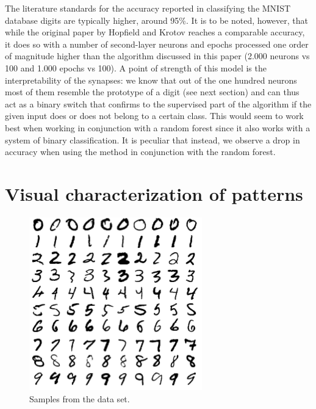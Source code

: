 \documentclass[a4paper]{report}
\begin{document}
The literature standards for the accuracy reported in classifying the MNIST database digits are typically higher, around 95\%.
It is to be noted, however, that while the original paper by Hopfield and Krotov reaches a comparable accuracy, it does so with a number of second-layer neurons and epochs processed one order of magnitude higher than the algorithm discussed in this paper (2.000 neurons vs 100 and 1.000 epochs vs 100).
A point of strength of this model is the interpretability of the synapses:
we know that out of the one hundred neurons most of them resemble the prototype of a digit (see next section) and can thus act as a binary switch that confirms to the supervised part of the algorithm if the given input does or does not belong to a certain class.
This would seem to work best when working in conjunction with a random forest since it also works with a system of binary classification.
It is peculiar that instead, we observe a drop in accuracy when using the method in conjunction with the random forest.

\section{Visual characterization of patterns}

\begin{figure} [H]
\centering
\includegraphics [width=7.5cm ] {o/mnist.png}
\caption{Samples from the data set.}
\label{mnist}
\end{figure}
\end{document}
